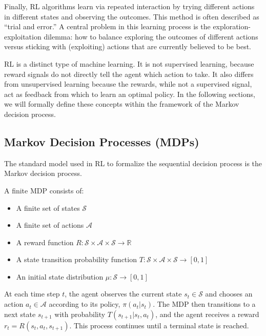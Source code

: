 Finally, RL algorithms learn via repeated interaction by trying different actions in different states and observing the outcomes. This method is often described as “trial and error.” A central problem in this learning process is the exploration-exploitation dilemma: how to balance exploring the outcomes of different actions versus sticking with (exploiting) actions that are currently believed to be best.

RL is a distinct type of machine learning. It is not supervised learning, because reward signals do not directly tell the agent which action to take. It also differs from unsupervised learning because the rewards, while not a supervised signal, act as feedback from which to learn an optimal policy. In the following sections, we will formally define these concepts within the framework of the Markov decision process.

\subsection*{Markov Decision Processes (MDPs)}
The standard model used in RL to formalize the sequential decision process is the Markov decision process.

\begin{definition}
A finite MDP consists of:
\begin{itemize}
    \item A finite set of states $\mathcal{S}$
    \item A finite set of actions $\mathcal{A}$
    \item A reward function $R: \mathcal{S} \times \mathcal{A} \times\mathcal{S} \rightarrow \mathbb{R}$
    \item A state transition probability function $T: \mathcal{S} \times \mathcal{A} \times \mathcal{S} \rightarrow [0,1]$
    \item An initial state distribution $\mu: \mathcal{S} \rightarrow [0,1]$
\end{itemize}
\end{definition}

At each time step $t$, the agent observes the current state $s_t \in \mathcal{S}$ and chooses an action $a_t \in \mathcal{A}$ according to its policy, $\pi(a_t | s_t)$. The MDP then transitions to a next state $s_{t+1}$ with probability $T(s_{t+1} | s_t, a_t)$, and the agent receives a reward $r_t = R(s_t, a_t, s_{t+1})$. This process continues until a terminal state is reached.

